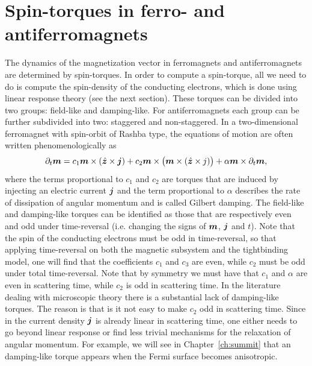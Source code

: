 \section{Spin-torques in ferro- and antiferromagnets}
The dynamics of the magnetization vector in ferromagnets and antiferromagnets are determined by spin-torques. In order to compute a spin-torque, all we need to do is compute the spin-density of the conducting electrons, which is done using linear response theory (see the next section).  
 These torques can be divided into two groups: field-like and damping-like. For antiferromagnets each group can be further subdivided into two: staggered and non-staggered. In a two-dimensional ferromagnet with spin-orbit of Rashba type, the equations of motion are often written phenomenologically as
\begin{equation}
    \partial_t \boldsymbol{m} = c_1 \boldsymbol{m}\times (\hat{\boldsymbol{z}}\times\boldsymbol{j}) + c_2 \boldsymbol{m}\times\big(\boldsymbol{m}\times (\hat{\boldsymbol{z}}\times{j})\big) + \alpha \boldsymbol{m}\times \partial_t \boldsymbol{m},
    \label{eq:sd:ferro}
\end{equation}
where the terms proportional to $c_1$ and $c_2$ are torques that are induced by injecting an electric current $\boldsymbol{j}$ and the term proportional to $\alpha$ describes the rate of dissipation of angular momentum and is called Gilbert damping. The field-like and damping-like torques can be identified as those that are respectively even and odd under time-reversal (i.e. changing the signs of $\boldsymbol{m}$, $\boldsymbol{j}$ and $t$). Note that the spin of the conducting electrons must be odd in time-reversal, so that applying time-reversal on both the magnetic subsystem and the tightbinding model, one will find that the coefficients $c_1$ and $c_3$ are even, while $c_2$ must be odd under total time-reversal. Note that by symmetry we must have that $c_1$ and $\alpha$ are even in scattering time, while $c_2$ is odd in scattering time. In the literature dealing with microscopic theory there is a substantial lack of damping-like torques. The reason is that is it not easy to make $c_2$ odd in scattering time. Since in the current density $\boldsymbol{j}$ is already linear in scattering time, one either needs to go beyond linear response or find less trivial mechanisms for the relaxation of angular momentum. For example, we will see in Chapter~\ref{ch:summit} that an damping-like torque appears when the Fermi surface becomes anisotropic. 

